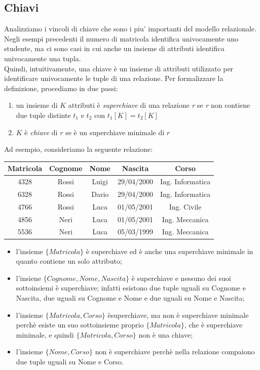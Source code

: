 \documentclass[12pt]{report}
\begin{document}
	\subsection{Chiavi}
	Analizziamo i vincoli di chiave che sono i piu' importanti del modello relazionale. Negli esempi precedenti il numero di matricola identifica univocamente uno studente, ma ci sono casi in cui anche un insieme di attributi identifica univocamente una tupla. \\
	Quindi, intuitivamente, una chiave è un insieme di attributi utilizzato per identificare univocamente le tuple di una relazione. Per formalizzare la definizione, procediamo in due passi:
	\begin{enumerate}
		\item un insieme di $K$ attributi è \textit{superchiave} di una relazione \textit{r} se \textit{r} non contiene due tuple distinte $t_1$ e $t_2$ con $t_1[K] = t_2[K]$
		\item $K$ è \textit{chiave} di $r$ se è un superchiave minimale di $r$
	\end{enumerate}
	Ad esempio, consideriamo la seguente relazione:
	\begin{center}
		\begin{tabular}{|c|c|c|c|c|}
			\hline
			\textbf{Matricola} & \textbf{Cognome} & \textbf{Nome} & \textbf{Nascita} & \textbf{Corso} \\
			\hline
			4328 & Rossi & Luigi & 29/04/2000 & Ing. Informatica \\
			6328 & Rossi & Dario & 29/04/2000 & Ing. Informatica \\
			4766 & Rossi & Luca & 01/05/2001 & Ing. Civile \\
			4856 & Neri & Luca & 01/05/2001 & Ing. Meccanica \\
			5536 & Neri & Luca & 05/03/1999 & Ing. Meccanica \\
			\hline
		\end{tabular}
	\end{center}
	\begin{itemize}
		\item l'insieme $\{Matricola\}$ è superchiave ed è anche una superchiave minimale in quanto contiene un solo attributo;
		\item l'insiene $\{Cognome, Nome, Nascita\}$ è superchiave e nessuno dei suoi sottoinsiemi è superchiave; infatti esistono due tuple uguali su Cognome e Nascita, due uguali su Cognome e Nome e due uguali su Nome e Nascita;
		\item l'insieme $\{Matricola, Corso\}$ èsuperchiave, ma non è superchiave minimale perchè esiste un suo sottoinsieme proprio $\{Matricola\}$, che è superchiave minimale, e quindi $\{Matricola, Corso\}$ non è una chiave;
		\item l'insieme $\{Nome, Corso\}$ non è superchiave perchè nella relazione compaiono due tuple uguali su Nome e Corso.
 	\end{itemize}
\end{document}
